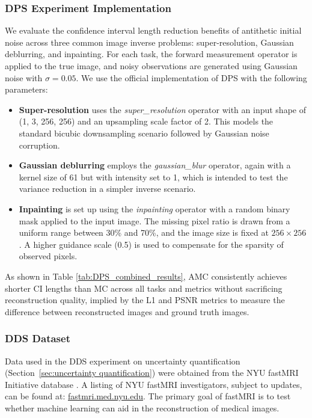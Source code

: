 \documentclass[12pt]{article}
\newcommand{\0}{\mathbf{0}}
\begin{document}
\subsubsection{DPS Experiment Implementation}

We evaluate the confidence interval length reduction benefits of antithetic initial noise across three common image inverse problems: super-resolution, Gaussian deblurring, and inpainting. For each task, the forward measurement operator is applied to the true image, and noisy observations are generated using Gaussian noise with $\sigma=0.05$. We use the official implementation of DPS \citep{chung2023diffusion} with the following parameters:

\begin{itemize}[leftmargin = *]
    \item \textbf{Super-resolution} uses the \textit{super\_resolution} operator with an input shape of (1, 3, 256, 256) and an upsampling scale factor of 2. This models the standard bicubic downsampling scenario followed by Gaussian noise corruption.

    \item \textbf{Gaussian deblurring} employs the \textit{gaussian\_blur} operator, again with a kernel size of 61 but with intensity set to 1, which is intended to test the variance reduction in a simpler inverse scenario.

    \item \textbf{Inpainting} is set up using the \textit{inpainting} operator with a random binary mask applied to the input image. The missing pixel ratio is drawn from a uniform range between 30\% and 70\%, and the image size is fixed at $256 \times 256$. A higher guidance scale (0.5) is used to compensate for the sparsity of observed pixels.
\end{itemize}

As shown in Table \ref{tab:DPS_combined_results}, AMC consistently achieves shorter CI lengths than MC across all tasks and metrics without sacrificing reconstruction quality, implied by the L1 and PSNR metrics to measure the difference between reconstructed images and ground truth images. 

\subsubsection{DDS Dataset}\label{subsect:fastmri}

Data used in the DDS experiment on uncertainty quantification (Section~\ref{sec:uncertainty quantification}) were obtained from the NYU fastMRI Initiative database \citep{knoll2020fastmri, zbontar2018fastmri}. A listing of NYU fastMRI investigators, subject to updates, can be found at: \url{fastmri.med.nyu.edu}. The primary goal of fastMRI is to test whether machine learning can aid in the reconstruction of medical images.
\end{document}
